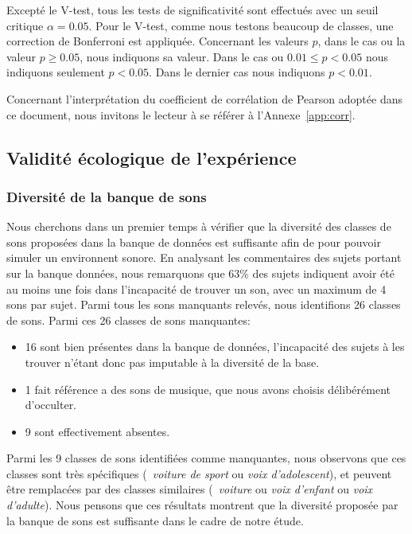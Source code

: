 Excepté le V-test, tous les tests de significativité  sont effectués avec un seuil critique $\alpha=0.05$. Pour le V-test, comme nous testons beaucoup de classes, une correction de Bonferroni  est appliquée. Concernant les valeurs $p$, dans le cas ou la valeur $p\geq0.05$, nous indiquons sa valeur. Dans le cas ou $0.01\leq p<0.05$ nous indiquons seulement $p<0.05$. Dans le dernier cas nous indiquons $p<0.01$.

Concernant l'interprétation du coefficient de corrélation de Pearson adoptée dans ce document, nous invitons le lecteur à se référer à l'Annexe~\ref{app:corr}.

\subsection{Validité écologique de l'expérience}

\subsubsection{Diversité de la banque de sons}

Nous cherchons dans un premier temps à vérifier que la diversité des classes de sons proposées dans la banque de données est suffisante afin de pour pouvoir simuler un environnent sonore. En analysant les commentaires des sujets portant sur la banque données, nous remarquons que 63\% des sujets indiquent avoir été au moins une fois dans l'incapacité de trouver un son, avec un maximum de 4 sons par sujet. Parmi tous les sons manquants relevés, nous identifions 26 classes de sons. Parmi ces 26 classes de sons manquantes:

\begin{itemize}
\item  16 sont bien présentes dans la banque de données, l'incapacité des sujets à les trouver n'étant donc pas imputable à la diversité de la base.
\item 1 fait référence a des sons de musique, que nous avons choisis délibérément d'occulter.
\item 9 sont effectivement absentes.  
\end{itemize}

Parmi les 9 classes de sons identifiées comme manquantes, nous observons que ces classes sont très spécifiques (\eg~\emph{voiture de sport} ou \emph{voix d'adolescent}), et peuvent être remplacées par des classes similaires (\eg~\emph{voiture} ou \emph{voix d'enfant} ou \emph{voix d'adulte}). Nous pensons que ces résultats montrent que la diversité proposée par la banque de sons est suffisante dans le cadre de notre étude.


